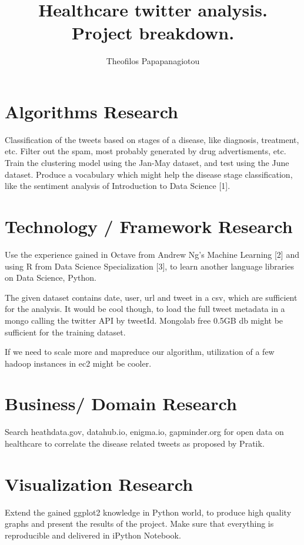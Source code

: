 \documentclass{article}
\begin{document}
\title{Healthcare twitter analysis.\\
Project breakdown.}
\author{Theofilos Papapanagiotou}

\maketitle

\section{Algorithms Research}
Classification of the tweets based on stages of a disease, like diagnosis,
treatment, etc.
Filter out the spam, most probably generated by drug advertisments, etc.
Train the clustering model using the Jan-May dataset, and test using
the June dataset.
Produce a vocabulary which might help the disease stage classification,
like the sentiment analysis of Introduction to Data Science [1].

\section{Technology / Framework Research}
Use the experience gained in Octave from Andrew Ng's Machine Learning [2] and
using R from Data Science Specialization [3], to learn another language
libraries on Data Science, Python.

The given dataset contains date, user, url and tweet in a csv, which are
sufficient for the analysis. It would be cool though, to load the full tweet
metadata in a mongo calling the twitter API by tweetId. Mongolab free 0.5GB db
might be sufficient for the training dataset.

If we need to scale more and mapreduce our algorithm, utilization of a few
hadoop instances in ec2 might be cooler.

\section{Business/ Domain Research}
Search heathdata.gov, datahub.io, enigma.io, gapminder.org for open data on
healthcare to correlate the disease related tweets as proposed by Pratik.

\section{Visualization Research}
Extend the gained ggplot2 knowledge in Python world, to produce high quality
graphs and present the results of the project.
Make sure that everything is reproducible and delivered in iPython Notebook.
\end{document}
